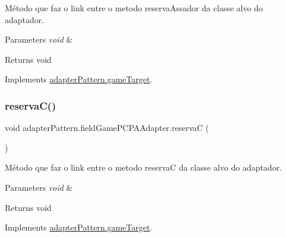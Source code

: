 Método que faz o link entre o metodo reserva\+Assador da classe alvo do adaptador. 


\begin{DoxyParams}{Parameters}
{\em void} & \\
\hline
\end{DoxyParams}
\begin{DoxyReturn}{Returns}
void 
\end{DoxyReturn}


Implements \mbox{\hyperlink{interfaceadapter_pattern_1_1game_target_a67348260f14d11e317195e2d66dbff18}{adapter\+Pattern.\+game\+Target}}.

\mbox{\label{classadapter_pattern_1_1field_game_p_c_p_a_adapter_ac8b2009b76c2c876592998ddd81a4a20}} 
\subsubsection{\texorpdfstring{reservaC()}{reservaC()}}
{\footnotesize\ttfamily void adapter\+Pattern.\+field\+Game\+P\+C\+P\+A\+Adapter.\+reservaC (\begin{DoxyParamCaption}{ }\end{DoxyParamCaption})}



Método que faz o link entre o metodo reservaC da classe alvo do adaptador. 


\begin{DoxyParams}{Parameters}
{\em void} & \\
\hline
\end{DoxyParams}
\begin{DoxyReturn}{Returns}
void 
\end{DoxyReturn}


Implements \mbox{\hyperlink{interfaceadapter_pattern_1_1game_target_ae8c1c944929700a3e120e641118c9188}{adapter\+Pattern.\+game\+Target}}.

\mbox{\label{classadapter_pattern_1_1field_game_p_c_p_a_adapter_a48109e67cbc5c62c1148f26e4fca8687}} 

